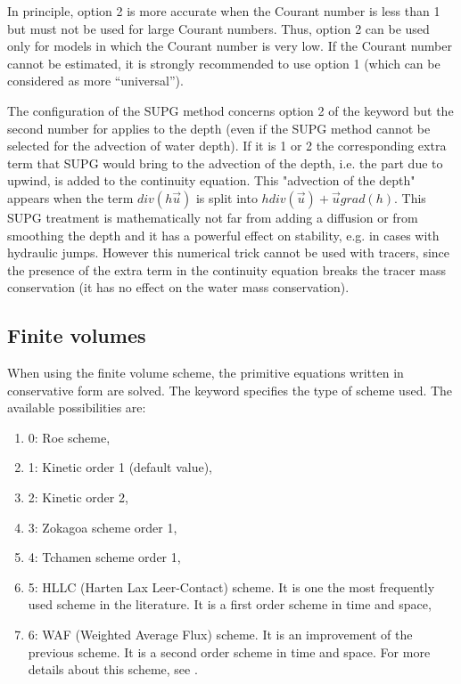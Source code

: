 In principle, option 2 is more accurate when the Courant number is less than 1 but must not be used for large Courant numbers. Thus, option 2 can be used only for models in which the Courant number is very low. If the Courant number cannot be estimated, it is strongly recommended to use option 1 (which can be considered as more ``universal'').

 The configuration of the SUPG method concerns option 2 of the keyword  but the second number for  applies to the depth (even if the SUPG method cannot be selected for the advection of water depth). If it is 1 or 2 the corresponding extra term that SUPG would bring to the advection of the depth, i.e. the part due to upwind, is added to the continuity equation. This "advection of the depth" appears when the term $div(h\vec{u})$ is split into $h div(\vec{u}) + \vec{u}grad(h)$. This SUPG treatment is mathematically not far from adding a diffusion or from smoothing the depth and it has a powerful effect on stability, e.g. in cases with hydraulic jumps. However this numerical trick cannot be used with tracers, since the presence of the extra term in the continuity equation breaks the tracer mass conservation (it has no effect on the water mass conservation).


\subsection{Finite volumes}
 When using the finite volume scheme, the primitive equations written in conservative form are solved. The keyword  specifies the type of scheme used. The available possibilities are:

\begin{enumerate}
\item [\nonumber]  0: Roe scheme,

\item [\nonumber]  1: Kinetic order 1 (default value),

\item [\nonumber]  2: Kinetic order 2,

\item [\nonumber]  3: Zokagoa scheme order 1,

\item [\nonumber]  4: Tchamen scheme order 1,

\item [\nonumber]  5: HLLC (Harten Lax Leer-Contact) scheme. It is one the most frequently used scheme in the literature. It is a first order scheme in time and space,

\item [\nonumber]  6: WAF (Weighted Average Flux) scheme. It is an improvement of the previous scheme. It is a second order scheme in time and space. For more details about this scheme, see \cite{Ata2013}.
\end{enumerate}
 
